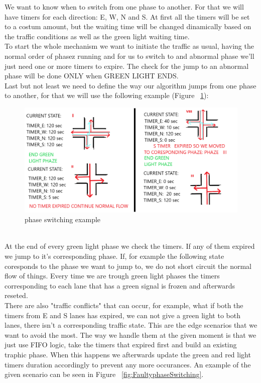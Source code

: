\documentclass[17pt]{report}
\begin{document}
\indent \indent
We want to know when to switch from one phase to another. For that we will have
timers for each direction: E, W, N and S. At first all the timers will be set to 
a costum amount, but the waiting time will be changed dinamically based on the 
traffic conditions as well as the green light waiting time.\\
\indent \indent
To start the whole mechanism we want to initiate the traffic as usual, 
having the normal order of phasez running and for us to switch to and abnormal 
phase we'll just need one or more timers to expire. The check for the jump to an abnormal phase
will be done ONLY when GREEN LIGHT ENDS.\\
\indent \indent
Last but not least we need to define the way our algorithm jumps from one phase to 
another, for that we will use the following example
(Figure ~\ref{fig:phasesSwitchingExample}):
\begin{figure}[h!]
    \includegraphics[width=\textwidth]{Sketches/SwitchingTroughphasesExample.png}
    \caption{phase switching example}
    \label{fig:phasesSwitchingExample}
\end{figure}
\\
\indent \indent
At the end of every green light phase we check the timers. If any of 
them expired we jump to it's corresponding phase. If, for example the following state
coresponds to the phase we want to jump to, we do not short circuit the normal flow of
things. Every time we are trough green light phases the timers corresponding to 
each lane that has a green signal is frozen and afterwards reseted.\\
\indent \indent
There are also "traffic conflicts" that can occur, for example, what if 
both the timers from E and S lanes has expired, we can not give a green light 
to both lanes, there isn't a corresponding traffic state. This are the edge 
scenarios that we want to avoid the most. The way we handle them at the given moment is 
that we just use FIFO logic, take the timers that expired first and build an existing traphic 
phase. When this happens we afterwards update the green and red light timers 
duration accordingly to prevent any more occurances. An example of the given 
scenario can be seen in Figure ~\ref{fig:FaultyphaseSwitching}. 
\end{document}
